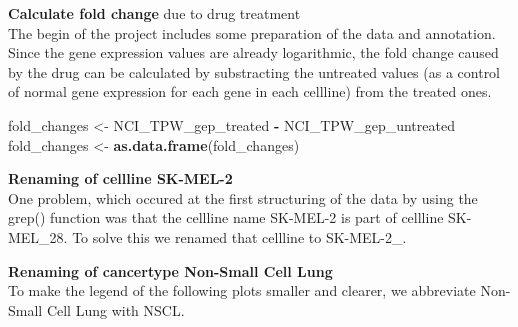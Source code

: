 \documentclass[]{article}
\newenvironment{Shaded}{\begin{snugshade}}{\end{snugshade}}
\newcommand{\CommentTok}[1]{\textcolor[rgb]{0.56,0.35,0.01}{\textit{#1}}}
\newcommand{\DecValTok}[1]{\textcolor[rgb]{0.00,0.00,0.81}{#1}}
\newcommand{\KeywordTok}[1]{\textcolor[rgb]{0.13,0.29,0.53}{\textbf{#1}}}
\newcommand{\NormalTok}[1]{#1}
\newcommand{\OperatorTok}[1]{\textcolor[rgb]{0.81,0.36,0.00}{\textbf{#1}}}
\newcommand{\StringTok}[1]{\textcolor[rgb]{0.31,0.60,0.02}{#1}}
\begin{document}
\textbf{Calculate fold change} due to drug treatment\\
The begin of the project includes some preparation of the data and
annotation. Since the gene expression values are already logarithmic,
the fold change caused by the drug can be calculated by substracting the
untreated values (as a control of normal gene expression for each gene
in each cellline) from the treated ones.

\begin{Shaded}
\begin{Highlighting}[]
\NormalTok{fold_changes <-}\StringTok{ }\NormalTok{NCI_TPW_gep_treated }\OperatorTok{-}\StringTok{ }\NormalTok{NCI_TPW_gep_untreated}
\NormalTok{fold_changes <-}\StringTok{ }\KeywordTok{as.data.frame}\NormalTok{(fold_changes)}
\end{Highlighting}
\end{Shaded}

\textbf{Renaming of cellline SK-MEL-2}\\
One problem, which occured at the first structuring of the data by using
the grep() function was that the cellline name SK-MEL-2 is part of
cellline SK-MEL\_28. To solve this we renamed that cellline to
SK-MEL-2\_.

\begin{Shaded}
\end{Shaded}

\textbf{Renaming of cancertype Non-Small Cell Lung}\\
To make the legend of the following plots smaller and clearer, we
abbreviate Non-Small Cell Lung with NSCL.
\end{document}
